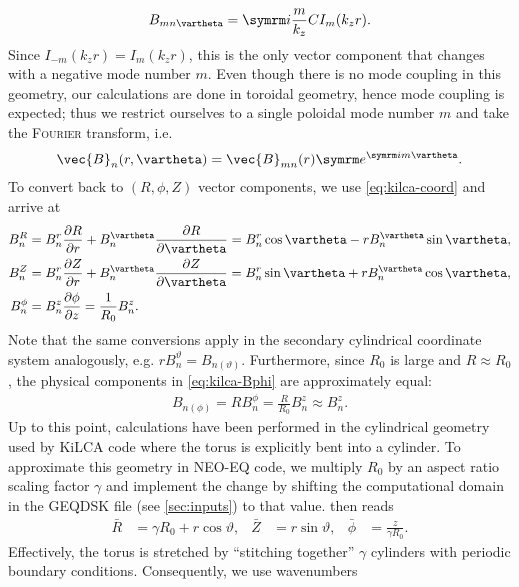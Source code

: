 \begin{gather}
  B_{m n \vartheta} = \im \frac{m}{k_{z}} C I_m(k_{z} r). \label{eq:kilca-Btheta}
\end{gather}
Since $I_{-m}(k_{z} r) = I_{m} (k_{z} r)$, this is the only vector component that changes with a negative mode number $m$. Even though there is no mode coupling in this geometry, our calculations are done in toroidal geometry, hence mode coupling is expected; thus we restrict ourselves to a single poloidal mode number $m$ and take the \textsc{Fourier} transform, i.e.
\begin{gather}
  \vec{B}_{n} (r, \vartheta) = \vec{B}_{m n} (r) \e^{\im m \vartheta}.
\end{gather}
To convert back to $(R, \phi, Z)$ vector components, we use \cref{eq:kilca-coord} and arrive at
\begin{align}
  B_{n}^{R} &= B_{n}^{r} \pd[R]{r} + B_{n}^{\vartheta} \pd[R]{\vartheta} = B_{n}^{r} \cos \vartheta - r B_{n}^{\vartheta} \sin \vartheta, \label{eq:kilca-BR} \\
  B_{n}^{Z} &= B_{n}^{r} \pd[Z]{r} + B_{n}^{\vartheta} \pd[Z]{\vartheta} = B_{n}^{r} \sin \vartheta + r B_{n}^{\vartheta} \cos \vartheta, \label{eq:kilca-BZ} \\
  B_{n}^{\phi} &= B_{n}^{z} \pd[\phi]{z} = \frac{1}{R_{0}} B_{n}^{z}. \label{eq:kilca-Bphi}
\end{align}
Note that the same conversions apply in the secondary cylindrical coordinate system analogously, e.g. $r B_{n}^{\vartheta} = B_{n (\vartheta)}$. Furthermore, since $R_{0}$ is large and $R \approx R_{0}$, the physical components in \cref{eq:kilca-Bphi} are approximately equal:
\begin{gather}
  B_{n (\phi)} = R B_{n}^{\phi} = \frac{R}{R_{0}} B_{n}^{z} \approx B_{n}^{z}.
\end{gather}
Up to this point, calculations have been performed in the cylindrical geometry used by KiLCA code where the torus is explicitly bent into a cylinder. To approximate this geometry in NEO-EQ code, we multiply $R_0$ by an aspect ratio scaling factor $\gamma$ and implement the change by shifting the computational domain in the GEQDSK file (see \cref{sec:inputs}) to that value.  then reads
\begin{align}
  \bar{R} &= \gamma R_{0} + r \cos \vartheta, & \bar{Z} &= r \sin \vartheta, & \bar{\phi} &= \frac{z}{\gamma R_0}. \label{eq:kilca-coord-scaled}
\end{align}
Effectively, the torus is stretched by \enquote{stitching together} $\gamma$ cylinders with periodic boundary conditions. Consequently, we use wavenumbers
